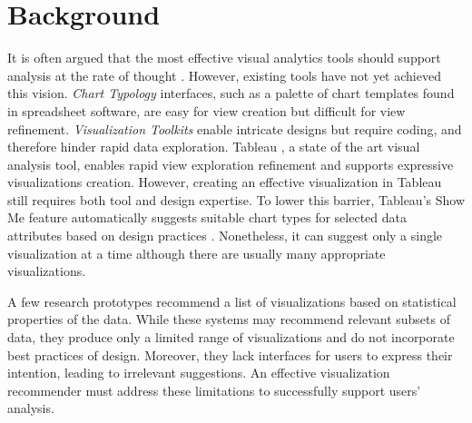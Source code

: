 \section*{Background}

It is often argued that the most effective visual analytics tools should support analysis at the rate of thought \cite{hanrahan:enthusiast}.
However, existing tools \cite{heer:dynamics} have not yet achieved this vision. \textit{Chart Typology} interfaces, such as a palette of chart templates found in spreadsheet software, are easy for view creation but difficult for view refinement.  \textit{Visualization Toolkits} \cite{bostock:d3, wilkinson:GoG} enable intricate designs but require coding, and therefore hinder rapid data exploration. Tableau \cite{stolte:polaris}, a state of the art visual analysis tool, enables rapid view exploration refinement and supports expressive visualizations creation.  However, creating an effective visualization in Tableau still requires both tool and design expertise.  To lower this barrier, Tableau's Show Me \cite{mackinlay:showme} feature automatically suggests suitable chart types for selected data attributes based on design practices \cite{tufte:visual, few:nowyouseeit}.  Nonetheless, it can suggest only a single visualization at a time although there are usually many appropriate visualizations.

A few research prototypes \cite{key:vizdeck, gotz:harvest, kandel:profiler} recommend a list of visualizations based on statistical properties of the data. While these systems may recommend relevant subsets of data, they produce only a limited range of visualizations and do not incorporate best practices of design.  Moreover, they lack interfaces for users to express their intention, leading to irrelevant suggestions.  An effective visualization recommender must address these limitations to successfully support users’ analysis.